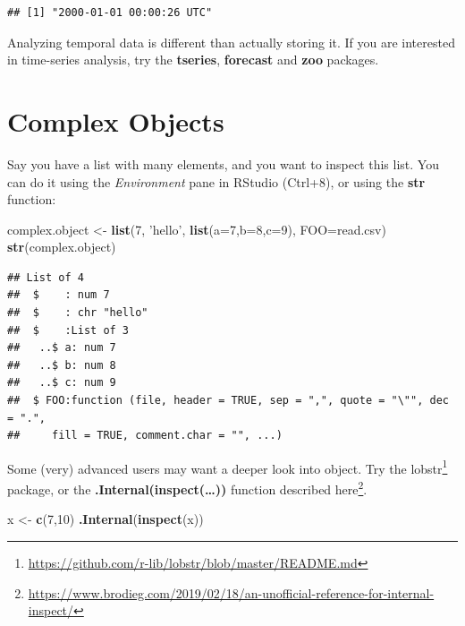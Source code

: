 \documentclass[]{book}
\newenvironment{Shaded}{\begin{snugshade}}{\end{snugshade}}
\newcommand{\DataTypeTok}[1]{\textcolor[rgb]{0.13,0.29,0.53}{#1}}
\newcommand{\DecValTok}[1]{\textcolor[rgb]{0.00,0.00,0.81}{#1}}
\newcommand{\KeywordTok}[1]{\textcolor[rgb]{0.13,0.29,0.53}{\textbf{#1}}}
\newcommand{\NormalTok}[1]{#1}
\newcommand{\StringTok}[1]{\textcolor[rgb]{0.31,0.60,0.02}{#1}}
\renewcommand{\href}[2]{#2\footnote{\url{#1}}}
\theoremstyle{definition}
\theoremstyle{definition}
\theoremstyle{definition}
\theoremstyle{remark}
\begin{document}
\begin{verbatim}
## [1] "2000-01-01 00:00:26 UTC"
\end{verbatim}

Analyzing temporal data is different than actually storing it.
If you are interested in time-series analysis, try the \textbf{tseries}, \textbf{forecast} and \textbf{zoo} packages.

\hypertarget{complex-objects}{%
\section{Complex Objects}\label{complex-objects}}

Say you have a list with many elements, and you want to inspect this list.
You can do it using the \emph{Environment} pane in RStudio (Ctrl+8), or using the \textbf{str} function:

\begin{Shaded}
\begin{Highlighting}[]
\NormalTok{complex.object <-}\StringTok{ }\KeywordTok{list}\NormalTok{(}\DecValTok{7}\NormalTok{, }\StringTok{'hello'}\NormalTok{, }\KeywordTok{list}\NormalTok{(}\DataTypeTok{a=}\DecValTok{7}\NormalTok{,}\DataTypeTok{b=}\DecValTok{8}\NormalTok{,}\DataTypeTok{c=}\DecValTok{9}\NormalTok{), }\DataTypeTok{FOO=}\NormalTok{read.csv)}
\KeywordTok{str}\NormalTok{(complex.object)}
\end{Highlighting}
\end{Shaded}

\begin{verbatim}
## List of 4
##  $    : num 7
##  $    : chr "hello"
##  $    :List of 3
##   ..$ a: num 7
##   ..$ b: num 8
##   ..$ c: num 9
##  $ FOO:function (file, header = TRUE, sep = ",", quote = "\"", dec = ".", 
##     fill = TRUE, comment.char = "", ...)
\end{verbatim}

Some (very) advanced users may want a deeper look into object.
Try the \href{https://github.com/r-lib/lobstr/blob/master/README.md}{lobstr} package, or the \textbf{.Internal(inspect(\ldots{}))} function described \href{https://www.brodieg.com/2019/02/18/an-unofficial-reference-for-internal-inspect/}{here}.

\begin{Shaded}
\begin{Highlighting}[]
\NormalTok{x <-}\StringTok{ }\KeywordTok{c}\NormalTok{(}\DecValTok{7}\NormalTok{,}\DecValTok{10}\NormalTok{)}
\KeywordTok{.Internal}\NormalTok{(}\KeywordTok{inspect}\NormalTok{(x))}
\end{Highlighting}
\end{Shaded}
\end{document}
